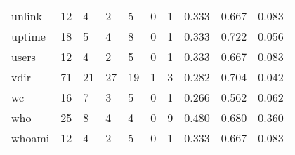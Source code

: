 \begin{longtable}{lp{1.3cm}p{1.3cm}p{1.3cm}p{1.3cm}p{1.3cm}p{1.3cm}p{1.3cm}p{1.3cm}p{1.3cm}}
unlink    &                     12 &                                             4 &                                            2 &                                           5 &                                            0 &                                          1 &                                0.333 &                                  0.667 &                                0.083 \\
uptime    &                     18 &                                             5 &                                            4 &                                           8 &                                            0 &                                          1 &                                0.333 &                                  0.722 &                                0.056 \\
users     &                     12 &                                             4 &                                            2 &                                           5 &                                            0 &                                          1 &                                0.333 &                                  0.667 &                                0.083 \\
vdir      &                     71 &                                            21 &                                           27 &                                          19 &                                            1 &                                          3 &                                0.282 &                                  0.704 &                                0.042 \\
wc        &                     16 &                                             7 &                                            3 &                                           5 &                                            0 &                                          1 &                                0.266 &                                  0.562 &                                0.062 \\
who       &                     25 &                                             8 &                                            4 &                                           4 &                                            0 &                                          9 &                                0.480 &                                  0.680 &                                0.360 \\
whoami    &                     12 &                                             4 &                                            2 &                                           5 &                                            0 &                                          1 &                                0.333 &                                  0.667 &                                0.083 \\

\end{longtable}
